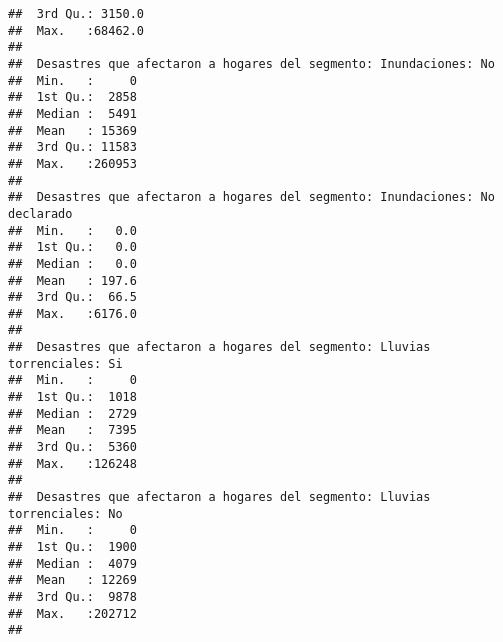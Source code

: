 \documentclass[11pt,]{article}
\begin{document}
\begin{verbatim}
##  3rd Qu.: 3150.0                                                 
##  Max.   :68462.0                                                 
##                                                                  
##  Desastres que afectaron a hogares del segmento: Inundaciones: No
##  Min.   :     0                                                  
##  1st Qu.:  2858                                                  
##  Median :  5491                                                  
##  Mean   : 15369                                                  
##  3rd Qu.: 11583                                                  
##  Max.   :260953                                                  
##                                                                  
##  Desastres que afectaron a hogares del segmento: Inundaciones: No declarado
##  Min.   :   0.0                                                            
##  1st Qu.:   0.0                                                            
##  Median :   0.0                                                            
##  Mean   : 197.6                                                            
##  3rd Qu.:  66.5                                                            
##  Max.   :6176.0                                                            
##                                                                            
##  Desastres que afectaron a hogares del segmento: Lluvias torrenciales: Si
##  Min.   :     0                                                          
##  1st Qu.:  1018                                                          
##  Median :  2729                                                          
##  Mean   :  7395                                                          
##  3rd Qu.:  5360                                                          
##  Max.   :126248                                                          
##                                                                          
##  Desastres que afectaron a hogares del segmento: Lluvias torrenciales: No
##  Min.   :     0                                                          
##  1st Qu.:  1900                                                          
##  Median :  4079                                                          
##  Mean   : 12269                                                          
##  3rd Qu.:  9878                                                          
##  Max.   :202712                                                          
##                                                                          

\end{verbatim}
\end{document}

